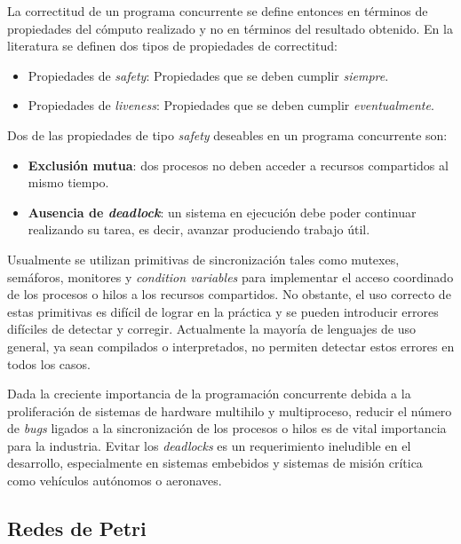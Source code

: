 \documentclass[12pt]{article}
\begin{document}
La correctitud de un programa concurrente se define entonces en términos de propiedades del cómputo realizado y no en términos del
resultado obtenido. En la literatura \cite{ben-ari2006, coulouris2012, tanenbaum2017} se definen dos tipos de propiedades de correctitud:

\begin{itemize}
    \item Propiedades de \textit{safety}: Propiedades que se deben cumplir \textit{siempre}.
    \item Propiedades de \textit{liveness}: Propiedades que se deben cumplir \textit{eventualmente}.
\end{itemize}

Dos de las propiedades de tipo \textit{safety} deseables en un programa concurrente son:

\begin{itemize}
    \item \textbf{Exclusión mutua}: dos procesos no deben acceder a recursos compartidos al mismo tiempo.
    \item \textbf{Ausencia de \textit{deadlock}}: un sistema en ejecución debe poder continuar realizando su tarea, es decir, avanzar produciendo trabajo útil.
\end{itemize}

Usualmente se utilizan primitivas de sincronización tales como mutexes, semáforos, monitores y \textit{condition variables}
para implementar el acceso coordinado de los procesos o hilos a los recursos compartidos.
No obstante, el uso correcto de estas primitivas es difícil de lograr en la práctica y se pueden introducir errores difíciles de detectar y corregir.
Actualmente la mayoría de lenguajes de uso general, ya sean compilados o interpretados, no permiten detectar estos errores en todos los casos.

Dada la creciente importancia de la programación concurrente debida a la proliferación de sistemas de hardware multihilo y multiproceso,
reducir el número de \textit{bugs} ligados a la sincronización de los procesos o hilos es de vital importancia para la industria.
Evitar los \textit{deadlocks} es un requerimiento ineludible en el desarrollo, especialmente en sistemas embebidos y sistemas de misión crítica como vehículos autónomos o aeronaves.

\subsection{Redes de Petri}
\end{document}
